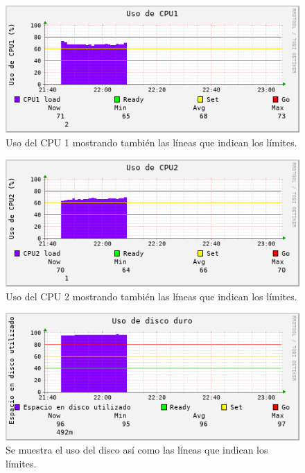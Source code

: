 \begin{figure}[!htpb]
	\hypertarget{fig:practica1_10}{\hspace{1pt}}
	\begin{center}
		\includegraphics{imagenes/LineaBase/practica1_10.png}
		\caption{Uso del CPU 1 mostrando también las líneas que indican los límites.}
		\label{fig:practica1_10}	
	\end{center}
\end{figure}


\begin{figure}[!htpb]
	\hypertarget{fig:practica1_11}{\hspace{1pt}}
	\begin{center}
		\includegraphics{imagenes/LineaBase/practica1_11.png}
		\caption{Uso del CPU 2 mostrando también las líneas que indican los límites.}
		\label{fig:practica1_11}	
	\end{center}
\end{figure}


\begin{figure}[!htpb]
	\hypertarget{fig:uso_disco}{\hspace{1pt}}
	\begin{center}
		\includegraphics{imagenes/LineaBase/uso_disco.png}
		\caption{Se muestra el uso del disco así como las líneas que indican los límites.}
		\label{fig:uso_disco}	
	\end{center}
\end{figure}

